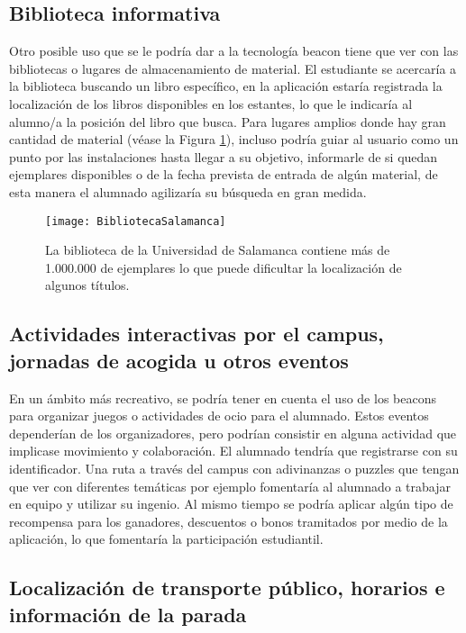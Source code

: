 \subsection{Biblioteca informativa}

Otro posible uso que se le podría dar a la tecnología beacon tiene que ver con las bibliotecas o lugares de almacenamiento de material. El estudiante se acercaría a la biblioteca buscando un libro específico, en la aplicación estaría registrada la localización de los libros disponibles en los estantes, lo que le indicaría al alumno/a la posición del libro que busca. Para lugares amplios donde hay gran cantidad de material (véase la Figura \ref{fig:bibliotecaUSAL}), incluso podría guiar al usuario como un punto por las instalaciones hasta llegar a su objetivo, informarle de si quedan ejemplares disponibles o de la fecha prevista de entrada de algún material, de esta manera el alumnado agilizaría su búsqueda en gran medida.

\begin{figure}[H]
	\centering
	\texttt{[image: BibliotecaSalamanca]}
	\caption{La biblioteca de la Universidad de Salamanca contiene más de 1.000.000 de ejemplares lo que puede dificultar la localización de algunos títulos.}
	\label{fig:bibliotecaUSAL}
\end{figure}

\subsection{Actividades interactivas por el campus, jornadas de acogida u otros eventos}

En un ámbito más recreativo, se podría tener en cuenta el uso de los beacons para organizar juegos o actividades de ocio para el alumnado. Estos eventos dependerían de los organizadores, pero podrían consistir en alguna actividad que implicase movimiento y colaboración. El alumnado tendría que registrarse con su identificador. Una ruta a través del campus con adivinanzas o puzzles que tengan que ver con diferentes temáticas por ejemplo fomentaría al alumnado a trabajar en equipo y utilizar su ingenio. Al mismo tiempo se podría aplicar algún tipo de recompensa para los ganadores, descuentos o bonos tramitados por medio de la aplicación, lo que fomentaría la participación estudiantil.

\subsection{Localización de transporte público, horarios e información de la parada}

